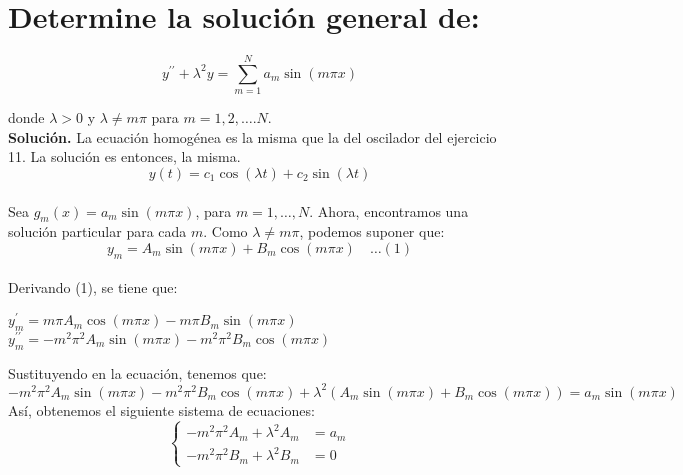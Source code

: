 \section{Determine la solución general de:}

\begin{equation*}
    y^{\prime \prime}+\lambda^{2} y=\sum_{m=1}^{N} a_{m} \sin (m \pi x)
\end{equation*}

donde $\lambda>0$ y $\lambda \neq m \pi$ para $m=1,2, \ldots . N$.\\

\textbf{Solución.} La ecuación homogénea es la misma que la del oscilador del ejercicio 11. La solución es entonces, la misma.\\
$$
y(t)=c_{1} \cos (\lambda t)+c_{2} \sin (\lambda t)
$$\\

Sea $g_{m}(x)=a_{m} \sin (m \pi x)$, para $m=1, \ldots, N$. Ahora, encontramos una solución particular para cada $m$. Como $\lambda \neq m \pi$, podemos suponer que:\\

$$
y_{m}=A_{m} \sin (m \pi x)+B_{m} \cos (m \pi x) \quad \ldots(1)
$$\\

Derivando (1), se tiene que:\\

\begin{center}
   $y_{m}^{\prime}=m \pi A_{m} \cos (m \pi x)-m \pi B_{m} \sin (m \pi x)$ \\
    
    $y_{m}^{\prime \prime}=-m^{2} \pi^{2} A_{m} \sin (m \pi x)-m^{2} \pi^{2} B_{m} \cos (m \pi x)$
\end{center}

Sustituyendo en la ecuación, tenemos que:\\

$-m^{2} \pi^{2} A_{m} \sin (m \pi x)-m^{2} \pi^{2} B_{m} \cos (m \pi x)+\lambda^{2}\left(A_{m} \sin (m \pi x)+B_{m} \cos (m \pi x)\right)=a_{m} \sin (m \pi x)$\\

Así, obtenemos el siguiente sistema de ecuaciones:\\
$$
\left\{\begin{array}{ll}
-m^{2} \pi^{2} A_{m}+\lambda^{2} A_{m} & =a_{m} \\
-m^{2} \pi^{2} B_{m}+\lambda^{2} B_{m} & =0
\end{array}\right.
$$\\

